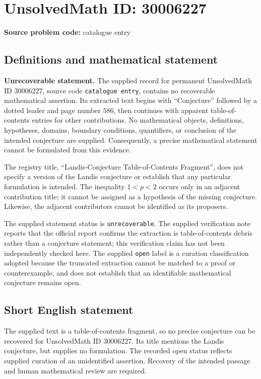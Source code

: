 \documentclass[11pt]{article}
\begin{document}
\section*{UnsolvedMath ID: 30006227}
\textbf{Source problem code:} catalogue entry
\subsection{Definitions and mathematical statement}
\textbf{Unrecoverable statement.} The supplied record for permanent UnsolvedMath ID \(30006227\), source code \texttt{catalogue entry}, contains no recoverable mathematical assertion. Its extracted text begins with ``Conjecture'' followed by a dotted leader and page number \(586\), then continues with apparent table-of-contents entries for other contributions. No mathematical objects, definitions, hypotheses, domains, boundary conditions, quantifiers, or conclusion of the intended conjecture are supplied. Consequently, a precise mathematical statement cannot be formulated from this evidence.

The registry title, ``Landis-Conjecture Table-of-Contents Fragment'', does not specify a version of the Landis conjecture or establish that any particular formulation is intended. The inequality \(1<p<2\) occurs only in an adjacent contribution title; it cannot be assigned as a hypothesis of the missing conjecture. Likewise, the adjacent contributors cannot be identified as its proposers.

The supplied statement status is \texttt{unrecoverable}. The supplied verification note reports that the official report confirms the extraction is table-of-contents debris rather than a conjecture statement; this verification claim has not been independently checked here. The supplied \texttt{open} label is a curation classification adopted because the truncated extraction cannot be matched to a proof or counterexample, and does not establish that an identifiable mathematical conjecture remains open.
\subsection{Short English statement}
The supplied text is a table-of-contents fragment, so no precise conjecture can be recovered for UnsolvedMath ID \(30006227\). Its title mentions the Landis conjecture, but supplies no formulation. The recorded open status reflects supplied curation of an unidentified assertion. Recovery of the intended passage and human mathematical review are required.
\end{document}
